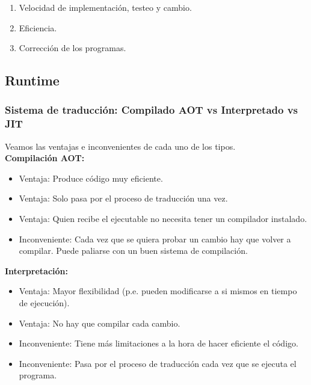 \begin{enumerate}
  \item Velocidad de implementación, testeo y cambio.
  
  \item Eficiencia.
  
  \item Corrección de los programas.
\end{enumerate}


\subsection{Runtime}
\subsubsection*{Sistema de traducción: Compilado AOT vs Interpretado vs JIT}
Veamos las ventajas e inconvenientes de cada uno de los tipos.\\

\textbf{Compilación AOT:}\\

\begin{itemize}
  \item {\color{okgreen} Ventaja}: Produce código muy eficiente.\\
  \item {\color{okgreen} Ventaja}: Solo pasa por el proceso de traducción una vez.\\
  \item {\color{okgreen} Ventaja}: Quien recibe el ejecutable no necesita tener un compilador instalado.\\
  \item {\color{myred} Inconveniente}: Cada vez que se quiera probar un cambio hay que volver a compilar. Puede paliarse con un buen sistema de compilación.\\
\end{itemize}

\textbf{Interpretación:}\\

\begin{itemize}
  \item {\color{okgreen} Ventaja}: Mayor flexibilidad (p.e. pueden modificarse a si mismos en tiempo de ejecución).\\
  \item {\color{okgreen} Ventaja}: No hay que compilar cada cambio.\\
  \item {\color{myred} Inconveniente}: Tiene más limitaciones a la hora de hacer eficiente el código.\\
  \item {\color{myred} Inconveniente}: Pasa por el proceso de traducción cada vez que se ejecuta el programa.\\
\end{itemize}

